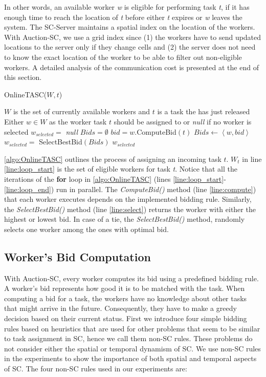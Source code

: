 \noindent In other words, an available worker \textit{w} is eligible for performing task \textit{t}, if it has enough time to reach the location of \textit{t} before either \textit{t} expires or \textit{w} leaves the system. The SC-Server maintains a spatial index on the location of the workers. With Auction-SC, we use a grid index since (1) the workers have to send updated locations to the server only if they change cells and (2) the server does not need to know the exact location of the worker to be able to filter out non-eligible workers. A detailed analysis of the communication cost is presented at the end of this section.

\begin{algorithm}
\caption{OnlineTASC($W, t$)}
\label{algo:OnlineTASC}
\begin{algorithmic}[1]
\REQUIRE $W$ is the set of currently available workers and $t$ is a task the has just released
\ENSURE Either $w \in W$ as the worker task $t$ should be assigned to or \emph{null} if no worker is selected
\STATE $w_{selected} = $ \emph{null}
\STATE $Bids = \emptyset$
 \label{line:loop_start}
	\STATE $bid = w$.ComputeBid$(t)$ \label{line:compute}
	\STATE $Bids \leftarrow \left\langle w, bid \right\rangle$
\ENDFOR \label{line:loop_end}
\STATE $w_{selected} = $ SelectBestBid$(Bids)$ \label{line:select}
\RETURN $w_{selected}$
\end{algorithmic}
\end{algorithm}

\cref{algo:OnlineTASC} outlines the process of assigning an incoming task $t$. $W_t$ in line \ref{line:loop_start} is the set of eligible workers for task \textit{t}. Notice that all the iterations of the \textbf{for} loop in \cref{algo:OnlineTASC} (lines \ref{line:loop_start}-\ref{line:loop_end}) run in parallel. The \emph{ComputeBid()} method (line \ref{line:compute}) that each worker executes depends on the implemented bidding rule. Similarly, the \emph{SelectBestBid()} method (line \ref{line:select}) returns the worker with either the highest or lowest bid. In case of a tie, the \emph{SelectBestBid()} method, randomly selects one worker among the ones with optimal bid.

\subsection{Worker's Bid Computation}

With Auction-SC, every worker computes its bid using a predefined bidding rule. A worker's bid represents how good it is to be matched with the task. When computing a bid for a task, the workers have no knowledge about other tasks that might arrive in the future. Consequently, they have to make a greedy decision based on their current status. First we introduce four simple bidding rules based on heuristics that are used for other problems that seem to be similar to task assignment in SC, hence we call them non-SC rules. These problems do not consider either the spatial or temporal dynamism of SC. We use non-SC rules in the experiments to show the importance of both spatial and temporal aspects of SC. The four non-SC rules used in our experiments are:


